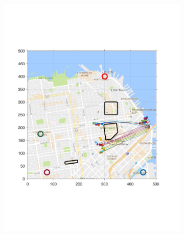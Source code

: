 \begin{figure}[!htb]
\begin{subfigure}{\columnwidth}
  \includegraphics[width=\columnwidth]{figs/sf_d6sep0_s2}
  \subcaption{}
  \label{fig:sf_d6sep0_s2}
\end{subfigure}%


\end{figure}
